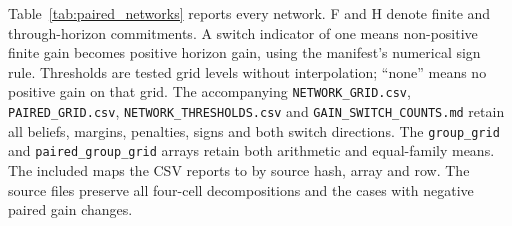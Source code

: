 \documentclass[preprint,11pt,authoryear]{elsarticle}
\begin{document}
Table~\ref{tab:paired_networks} reports every network. F and H denote finite and through-horizon commitments. A switch indicator of one means non-positive finite gain becomes positive horizon gain, using the manifest's numerical sign rule. Thresholds are tested grid levels without interpolation; ``none'' means no positive gain on that grid. The accompanying \texttt{NETWORK\_GRID.csv}, \texttt{PAIRED\_GRID.csv}, \texttt{NETWORK\_THRESHOLDS.csv} and \texttt{GAIN\_SWITCH\_COUNTS.md} retain all beliefs, margins, penalties, signs and both switch directions. The \texttt{group\_grid} and \texttt{paired\_group\_grid} arrays retain both arithmetic and equal-family means. The included  maps the CSV reports to  by source hash, array and row. The source files preserve all four-cell decompositions and the cases with negative paired gain changes.
\clearpage%
\begingroup\small\setlength{\tabcolsep}{3.5pt}\renewcommand{\arraystretch}{1.14}
\renewcommand{\thetable}{H1}\setlength{\LTcapwidth}{\linewidth}
\end{document}
